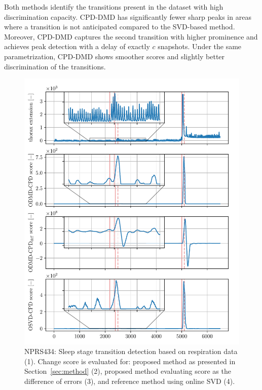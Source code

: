 Both methods identify the transitions present in the dataset with high discrimination capacity. CPD-DMD has significantly fewer sharp peaks in areas where a transition is not anticipated compared to the SVD-based method. Moreover, CPD-DMD captures the second transition with higher prominence and achieves peak detection with a delay of exactly \(c\) snapshots. Under the same parametrization, CPD-DMD shows smoother scores and slightly better discrimination of the transitions.

\begin{figure}[H]
    \centering
    \includegraphics[width=\linewidth]{figures/nprs44-chd_r2-roll_301-dmd_w1.0-h80.pdf}
    \caption{NPRS434: Sleep stage transition detection based on respiration data (1). Change score is evaluated for: proposed method as presented in Section~\ref{sec:method} (2), proposed method evaluating score as the difference of errors (3), and reference method using online SVD (4).}\label{fig:nprs44}
\end{figure}

